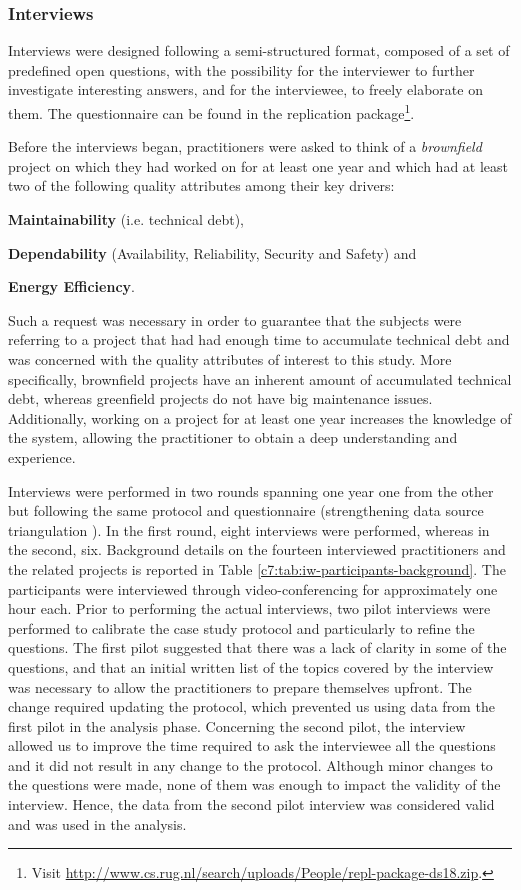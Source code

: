 \subsubsection{Interviews}\label{c7:sec:interviews}
Interviews were designed following a semi-structured format, composed of a set of predefined open questions, with the possibility for the interviewer to further investigate interesting answers, and for the interviewee, to freely elaborate on them.
The questionnaire can be found in the replication package\footnote{Visit \url{http://www.cs.rug.nl/search/uploads/People/repl-package-ds18.zip}. }.

Before the interviews began, practitioners were asked to think of a \textit{brownfield} project on which they had worked on for at least one year and which had at least two of the following quality attributes among their key drivers: \begin{inlinelist}  \item \textbf{Maintainability} (i.e. technical debt), \item \textbf{Dependability} (Availability, Reliability, Security and Safety) and \item \textbf{Energy Efficiency}.\end{inlinelist}
Such a request was necessary in order to guarantee that the subjects were referring to a project that had had enough time to accumulate technical debt and was concerned with the quality attributes of interest to this study.
More specifically, brownfield projects have an inherent amount of accumulated technical debt, whereas greenfield projects do not have big maintenance issues.
Additionally, working on a project for at least one year increases the knowledge of the system, allowing the practitioner to obtain a deep understanding and experience.

Interviews were performed in two rounds spanning one year one from the other but following the same protocol and questionnaire (strengthening data source triangulation \cite{Runeson2012}). In the first round, eight interviews were performed, whereas in the second, six.
Background details on the fourteen interviewed practitioners and the related projects is reported in Table \ref{c7:tab:iw-participants-background}. The participants were interviewed through video-conferencing for approximately one hour each. 
Prior to performing the actual interviews, two pilot interviews were performed to calibrate the case study protocol and particularly to refine the questions. The first pilot suggested that there was a lack of clarity in some of the questions, and that an initial written list of the topics covered by the interview was necessary to allow the practitioners to prepare themselves upfront.
The change required updating the protocol, which prevented us using data from the first pilot in the analysis phase.
Concerning the second pilot, the interview allowed us to improve the time required to ask the interviewee all the questions and it did not result in any change to the protocol.
Although minor changes to the questions were made, none of them was enough to impact the validity of the interview. Hence, the data from the second pilot interview was considered valid and was used in the analysis.

